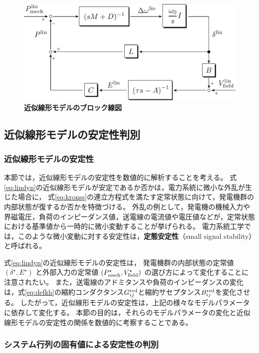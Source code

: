 \documentclass[tombow,dvipdfmx]{corona-a5-1.1}
\begin{document}
\begin{figure}[t]
\centering
\includegraphics[width = .8\linewidth]{figs/blocklinsys3}
\medskip
\caption{\textbf{近似線形モデルのブロック線図}}
\label{fig:blocklinsys}
\medskip
\end{figure}

\subsection{近似線形モデルの安定性判別}

\smallskip
\subsubsection{近似線形モデルの安定性}

本節では，近似線形モデルの安定性を数値的に解析することを考える。
式\ref{eq:lindyn}の近似線形モデルが安定であるか否かは，電力系統に微小な外乱が生じた場合に，
式\ref{eq:kronss}の連立方程式を満たす定常状態に向けて，発電機群の内部状態が復するか否かを特徴づける。
外乱の例として，発電機の機械入力や界磁電圧，負荷のインピーダンス値，送電線の電流値や電圧値などが，定常状態における基準値から一時的に微小変動することが挙げられる。
電力系統工学では，このような微小変動に対する安定性は，\textbf{定態安定性}（small signal stability）と呼ばれる。


式\ref{eq:lindyn}の近似線形モデルの安定性は，
発電機群の内部状態の定常値
$(\delta^{\star},E^{\star})$
と外部入力の定常値
$(P_{{\rm mech}}^{\star},V_{{\rm field}}^{\star})$
の選び方によって変化することに注意されたい。
また，送電線のアドミタンスや負荷のインピーダンスの変化は，式\ref{eq:defkh}の縮約コンダクタンス$G^{\rm red}_{ij}$と縮約サセプタンス$B^{\rm red}_{ij}$を変化させる。
したがって，近似線形モデルの安定性は，上記の様々なモデルパラメータに依存して変化する。
本節の目的は，それらのモデルパラメータの変化と近似線形モデルの安定性の関係を数値的に考察することである。

\smallskip
\subsubsection{システム行列の固有値による安定性の判別}
\end{document}
